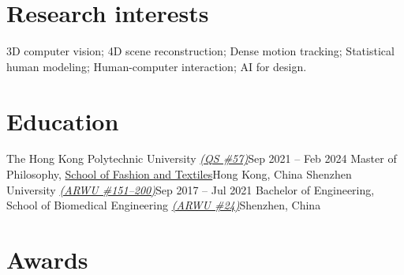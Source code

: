 \documentclass[letterpaper,11pt]{article}
\begin{document}
    \maketitle

    \section{Research interests}

    \begin{resumeItemize}
        \item 3D computer vision; 4D scene reconstruction; Dense motion tracking; Statistical human modeling; Human-computer interaction; AI for design.
    \end{resumeItemize}
    
    \section{Education}

    \resumeColumnsStart
        \resumeEntry
            {The Hong Kong Polytechnic University
            \href{https://www.topuniversities.com/world-university-rankings/2025?page=3}{\textsl{(QS \#57)}}}{Sep 2021 -- Feb 2024}
            {Master of Philosophy, \href{https://www.polyu.edu.hk/sft/}{School of Fashion and Textiles}}{Hong Kong, China}
        \resumeEntry
            {Shenzhen University
            \href{https://www.shanghairanking.com/institution/shenzhen-university}{\textsl{(ARWU \#151--200)}}}{Sep 2017 -- Jul 2021}
            {Bachelor of Engineering, School of Biomedical Engineering
            \href{https://www.shanghairanking.com/rankings/gras/2023/RS0208}{\textsl{(ARWU \#24)}}}{Shenzhen, China}
    \resumeColumnsEnd

    \section{Awards}
\end{document}
